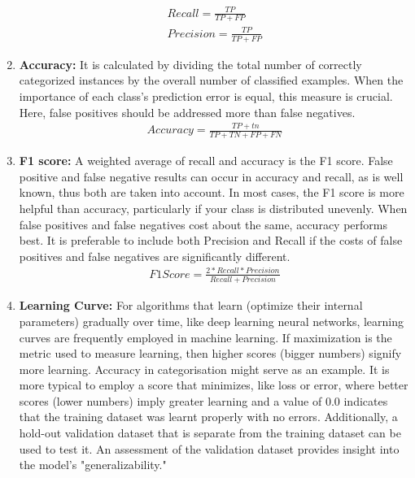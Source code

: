 \begin{enumerate}
\newline
\begin{align*}
Recall = \frac{TP}{TP+FP} 
\\
Precision = \frac{TP}{TP+FP}
\end{align*}
\newline
    \item \textbf{Accuracy:} It is calculated by dividing the total number of correctly categorized instances by the overall number of classified examples. When the importance of each class's prediction error is equal, this measure is crucial. Here, false positives should be addressed more than false negatives.
\newline
\begin{align*}
Accuracy = \frac{TP+tn}{TP+TN+FP+FN} 
\end{align*}
\newline
    \item \textbf{F1 score:} A weighted average of recall and accuracy is the F1 score. False positive and false negative results can occur in accuracy and recall, as is well known, thus both are taken into account. In most cases, the F1 score is more helpful than accuracy, particularly if your class is distributed unevenly. When false positives and false negatives cost about the same, accuracy performs best. It is preferable to include both Precision and Recall if the costs of false positives and false negatives are significantly different.
\newline
\begin{align*}
F1 Score = \frac{2*Recall*Precision}{Recall+Precision} 
\end{align*}
\newline
    \item \textbf{Learning Curve:} For algorithms that learn (optimize their internal parameters) gradually over time, like deep learning neural networks, learning curves are frequently employed in machine learning. If maximization is the metric used to measure learning, then higher scores (bigger numbers) signify more learning. Accuracy in categorisation might serve as an example. It is more typical to employ a score that minimizes, like loss or error, where better scores (lower numbers) imply greater learning and a value of 0.0 indicates that the training dataset was learnt properly with no errors. Additionally, a hold-out validation dataset that is separate from the training dataset can be used to test it. An assessment of the validation dataset provides insight into the model's "generalizability."
\end{enumerate}